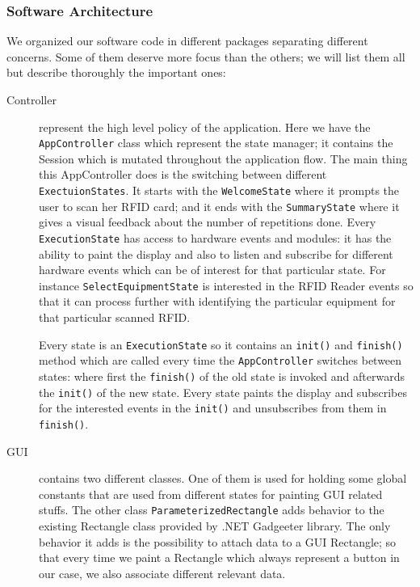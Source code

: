 \documentclass{tk3-team}
\begin{document}
\subsubsection{Software Architecture}

We organized our software code in different packages separating different concerns. Some of them deserve more focus than the others; we will list them all but describe thoroughly the important ones:

\begin{description}
\item[Controller] represent the high level policy of the application. Here we have the \texttt{AppController} class which represent the state manager; it contains the Session which is mutated throughout the application flow. The main thing this AppController does is the switching between different \texttt{ExectuionStates}. It starts with the \texttt{WelcomeState} where it prompts the user to scan her RFID card; and it ends with the \texttt{SummaryState} where it gives a visual feedback about the number of repetitions done. Every \texttt{ExecutionState} has access to hardware events and modules: it has the ability to paint the display and also to listen and subscribe for different hardware events which can be of interest for that particular state. For instance \texttt{SelectEquipmentState} is interested in the RFID Reader events so that it can process further with identifying the particular equipment for that particular scanned RFID. 

Every state is an \texttt{ExecutionState} so it contains an \texttt{init()} and \texttt{finish()} method which are called every time the \texttt{AppController} switches between states: where first the \texttt{finish()} of the old state is invoked and afterwards the \texttt{init()} of the new state. Every state paints the display and subscribes for the interested events in the \texttt{init()} and unsubscribes from them in \texttt{finish()}.

\item[GUI] contains two different classes. One of them is used for holding some global constants that are used from different states for painting GUI related stuffs. The other class \texttt{ParameterizedRectangle} adds behavior to the existing Rectangle class provided by .NET Gadgeeter library. The only behavior it adds is the possibility to attach data to a GUI Rectangle; so that every time we paint a Rectangle which always represent a button in our case, we also associate different relevant data.  


\end{description}
\end{document}
